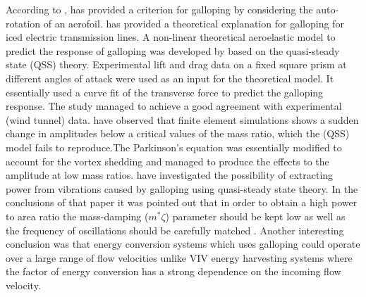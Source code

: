 According to \cite{Paidoussis2010},\cite{Glauert1919} has provided a criterion for galloping by considering the auto-rotation of an aerofoil.  \cite{DenHartog1956}  has provided a theoretical explanation for galloping for iced electric transmission lines. A non-linear theoretical aeroelastic model to predict the response of galloping was developed by \cite{Parkinson1964} based on the quasi-steady state (QSS) theory. Experimental lift and drag data on a fixed square prism at different angles of attack were used as an input for the theoretical model. It essentially used a curve fit of the transverse force to predict the galloping response. The study managed to achieve a good agreement with experimental (wind tunnel) data.\cite{Joly2012} have observed that finite element simulations shows a sudden change in amplitudes  below a critical values of the mass ratio, which the  (QSS) model fails to reproduce.The Parkinson's equation was essentially modified to account for the vortex shedding and managed to produce the effects to the amplitude at low mass ratios.
\cite{Barrero-Gil2010a} have investigated the possibility of extracting power from vibrations caused by galloping using quasi-steady state theory. In the conclusions of that paper it was pointed out that in order to obtain a high power to area ratio the mass-damping ($m^*\zeta$) parameter should be kept low as well as the frequency of oscillations should be carefully matched . Another interesting conclusion was that energy conversion systems which uses galloping could operate over  a large range of flow velocities unlike VIV energy harvesting systems where the factor of energy conversion has a strong dependence on the incoming flow velocity. 